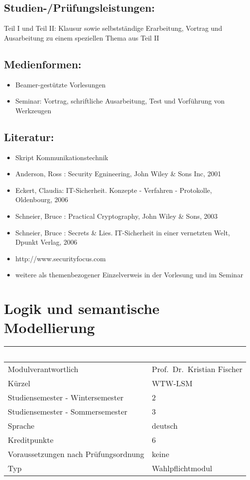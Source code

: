 \section*{Studien-/Prüfungsleistungen:}\label{studien-pruxfcfungsleistungen-19}

Teil I und Teil II: Klausur sowie selbstständige Erarbeitung, Vortrag
und Ausarbeitung zu einem speziellen Thema aus Teil II

\section*{Medienformen:}\label{medienformen-19}

\begin{itemize}
\item
  Beamer-gestützte Vorlesungen
\item
  Seminar: Vortrag, schriftliche Ausarbeitung, Test und Vorführung von
  Werkzeugen
\end{itemize}

\section*{Literatur:}\label{literatur-16}

\begin{itemize}
\item
  Skript Kommunikationstechnik
\item
  Anderson, Ross : Security Egnineering, John Wiley \& Sons Inc, 2001
\item
  Eckert, Claudia: IT-Sicherheit. Konzepte - Verfahren - Protokolle,
  Oldenbourg, 2006
\item
  Schneier, Bruce : Practical Cryptography, John Wiley \& Sons, 2003
\item
  Schneier, Bruce : Secrets \& Lies. IT-Sicherheit in einer vernetzten
  Welt, Dpunkt Verlag, 2006
\item
  http://www.securityfocus.com
\item
  weitere als themenbezogener Einzelverweis in der Vorlesung und im
  Seminar
\end{itemize}

\chapter{Logik und semantische
Modellierung}\label{logik-und-semantische-modellierung}

\begin{longtable}[]{@{}ll@{}}
\toprule
~ & ~\tabularnewline
\midrule
\endhead
Modulverantwortlich & Prof.~Dr.~Kristian Fischer\tabularnewline
Kürzel & WTW-LSM\tabularnewline
Studiensemester - Wintersemester & 2\tabularnewline
Studiensemester - Sommersemester & 3\tabularnewline
Sprache & deutsch\tabularnewline
Kreditpunkte & 6\tabularnewline
Voraussetzungen nach Prüfungsordnung & keine\tabularnewline
Typ & Wahlpflichtmodul\tabularnewline
\bottomrule
\end{longtable}

